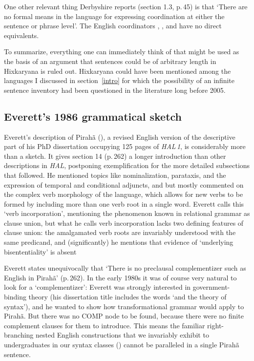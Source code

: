 \documentclass[output=paper,colorlinks,citecolor=brown
]{langscibook}
\begin{document}
One other relevant thing Derbyshire reports (section 1.3, p.\,45) is that
`There are no formal means in the language for expressing coordination at
either the sentence or phrase level'. The English coordinators ,
, and  have no direct equivalents.

To summarize, everything one can immediately think of that might be used
as the basis of an argument that sentences could be of arbitrary length
in Hixkaryana is ruled out. Hixkaryana could have been mentioned among
the languages I discussed in section~\ref{intro} for which the possibility
of an infinite sentence inventory had been questioned in the literature
long before 2005.

\subsection{Everett's 1986 grammatical sketch}

Everett's description of Pirah{\~a} (\citeyear{Everett86HAL}), a revised
English version of the descriptive part of his PhD dissertation occupying
125 pages of \textit{HAL\,1}, is considerably more than a sketch. It
gives section 14 (p.\,262) a longer introduction than other descriptions
in \textit{HAL}, postponing exemplification for the more detailed
subsections that followed. He mentioned topics like nominalization,
parataxis, and the expression of temporal and conditional adjuncts,
and but mostly commented on the complex verb morphology of the
language, which allows for new verbs to be formed by including more
than one verb root in a single word. Everett calls this `verb
incorporation', mentioning the phenomenon known in relational grammar
as clause union, but what he calls verb incorporation lacks two
defining features of clause union: the amalgamated verb roots are
invariably understood with the same predicand, and (significantly)
he mentions that evidence of `underlying bisententiality' is absent

Everett states unequivocally that `There is no preclausal complementizer
such as English  in Pirah{\~a}' (p.\,262). In the early 1980s
it was of course very natural to look for a `complementizer': Everett
was strongly interested in government-binding theory (his dissertation
title includes the words `and the theory of syntax'), and he wanted to
show how transformational grammar would apply to Pirah{\~a}. But there
was no COMP node to be found, because there were no finite complement
clauses for them to introduce. This means the familiar right-branching
nested English constructions that we invariably exhibit to undergraduates
in our syntax classes ()
cannot be paralleled in a single Pirah{\~a} sentence.
\end{document}
